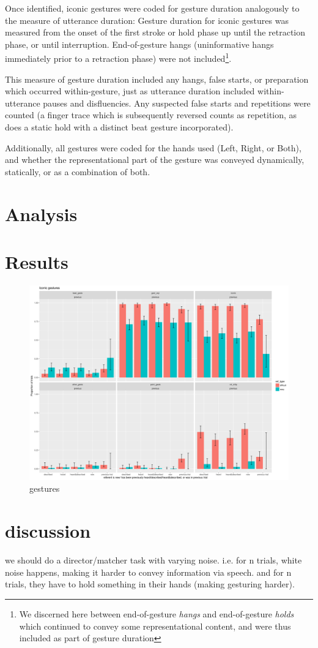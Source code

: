 \documentclass[a4paper,man,natbib]{apa6}
\newcommand*{\term}[1]{\emph{#1}} %
\begin{document}
Once identified, iconic gestures were coded for gesture duration analogously to the measure of utterance duration:
Gesture duration for iconic gestures was measured from the onset of the first stroke or hold phase up until the retraction phase, or until interruption.
End-of-gesture hangs (uninformative hangs immediately prior to a retraction phase) were not included\footnote{We discerned here between end-of-gesture \term{hangs} and end-of-gesture \term{holds} which continued to convey some representational content, and were thus included as part of gesture duration}.

This measure of gesture duration included any hangs, false starts, or preparation which occurred within-gesture, just as utterance duration included within-utterance pauses and disfluencies.
Any suspected false starts and repetitions were counted (a finger trace which is subsequently reversed counts as repetition, as does a static hold with a distinct beat gesture incorporated).

Additionally, all gestures were coded for the hands used (Left, Right, or Both), and whether the representational part of the gesture was conveyed dynamically, statically, or as a combination of both. 



\section{Analysis}

\section{Results}
\begin{figure}
  \centering
	\includegraphics[width=\linewidth]{previousplot.png}
  \caption{gestures}
  \label{fig:plot}
\end{figure}

\section{discussion}
we should do a director/matcher task with varying noise. i.e. for n trials, white noise happens, making it harder to convey information via speech.
and for n trials, they have to hold something in their hands (making gesturing harder).






\end{document}

